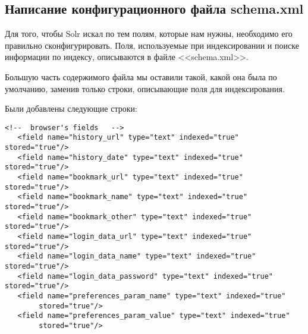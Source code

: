\subsection{Написание конфигурационного файла schema.xml}

Для того, чтобы Solr искал по тем полям, которые нам нужны, необходимо его правильно сконфигурировать. Поля, используемые при индексировании и поиске информации по индексу, описываются в файле <<schema.xml>>.

Большую часть содержимого файла мы оставили такой, какой она была по умолчанию, заменив только строки, описывающие поля для индексирования.

Были добавлены следующие строки:

\begin{lstlisting}
<!--  browser's fields   -->
   <field name="history_url" type="text" indexed="true" stored="true"/>
   <field name="history_date" type="text" indexed="true" stored="true"/>
   <field name="bookmark_url" type="text" indexed="true" stored="true"/>
   <field name="bookmark_name" type="text" indexed="true" stored="true"/>
   <field name="bookmark_other" type="text" indexed="true" stored="true"/>
   <field name="login_data_url" type="text" indexed="true" stored="true"/>
   <field name="login_data_name" type="text" indexed="true" stored="true"/>
   <field name="login_data_password" type="text" indexed="true" stored="true"/>
   <field name="preferences_param_name" type="text" indexed="true" 
        stored="true"/>
   <field name="preferences_param_value" type="text" indexed="true" 
        stored="true"/>
   

\end{lstlisting}
